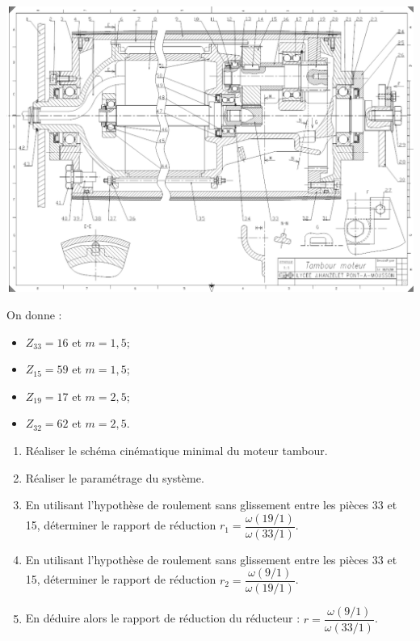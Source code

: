 \documentclass[10pt,oneside]{article}
\begin{document}
\begin{center}
\includegraphics[width=.95\textwidth]{png/fig01}
\end{center}

On donne :
\begin{itemize}
\item $Z_{33}=16$ et $m=1,5$;
\item $Z_{15}=59$ et $m=1,5$;
\item $Z_{19}=17$ et $m=2,5$;
\item $Z_{32}=62$ et $m=2,5$.
\end{itemize}

\begin{enumerate}
\item Réaliser le schéma cinématique minimal du moteur tambour.
\item Réaliser le paramétrage du système.
\item En utilisant l'hypothèse de roulement sans glissement entre les pièces 33 et 15, déterminer le rapport de réduction $r_1=\dfrac{\omega(19/1)}{\omega(33/1)}$.
\item En utilisant l'hypothèse de roulement sans glissement entre les pièces 33 et 15, déterminer le rapport de réduction $r_2=\dfrac{\omega(9/1)}{\omega(19/1)}$.
\item En déduire alors le rapport de réduction du réducteur : $r=\dfrac{\omega(9/1)}{\omega(33/1)}$.
\end{enumerate}
\end{document}
